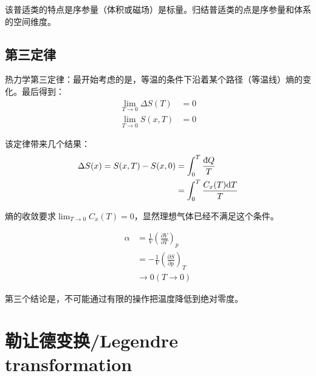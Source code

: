 \documentclass[a4paper, 10pt, openany]{book}%
\begin{document}
该普适类的特点是序参量（体积或磁场）是标量。归结普适类的点是序参量和体系的空间维度。

\section{第三定律}

热力学第三定律：最开始考虑的是，等温的条件下沿着某个路径（等温线）熵的变化。最后得到：
\begin{align}
\lim_{T\to 0} \Delta S(T)&=0\\
\lim_{T\to 0}  S(x,T)&=0
\end{align}

该定律带来几个结果：
\begin{align}
\Delta S(x)=S(x,T)-S(x,0)&=\int_0^T\frac{\text{\dj}Q}{T}\\
&=\int_0^T\frac{C_x(T)\mathrm{d}T}{T}
\end{align}

熵的收敛要求$\lim_{T\to 0}C_x(T)=0$，显然理想气体已经不满足这个条件。

\begin{align}
\alpha&=\frac{1}{V}\left(\frac{\partial V}{\partial T}\right)_p\\
&=-\frac{1}{V}\left(\frac{\partial S}{\partial p}\right)_T\\
&\to 0(T \to 0)
\end{align}

第三个结论是，不可能通过有限的操作把温度降低到绝对零度。








\newpage
\appendix
\chapter{勒让德变换/Legendre transformation}
\end{document}
